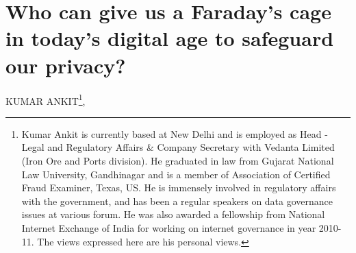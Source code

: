 \chapter{Who can give us a Faraday’s cage in today’s digital age to safeguard our privacy?}
\vskip -15pt


\begin{center}
{\large\uppercase{Kumar Ankit}}\footnote{Kumar Ankit is currently based at New Delhi and is employed as Head - Legal and Regulatory Affairs \& Company Secretary with Vedanta Limited (Iron Ore and Ports division). He graduated in law from Gujarat National Law University, Gandhinagar and is a member of Association of Certified Fraud Examiner, Texas, US. He is immensely involved in regulatory affairs with the government, and has been a regular speakers on data governance issues at various forum. He was also awarded a fellowship from National Internet Exchange of India for working on internet governance in year 2010-11. The views expressed here are his personal views.}, 


\end{center}

\vskip 2.3cm



\vfill
\newpage

